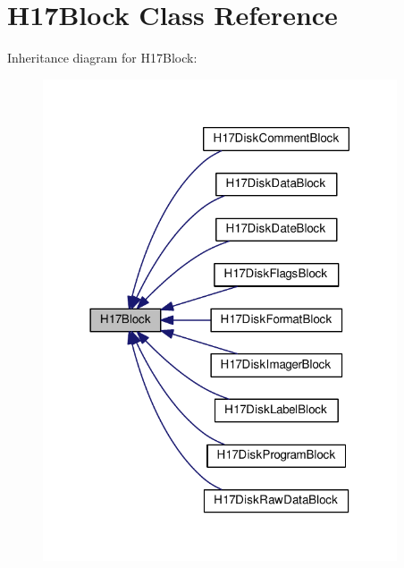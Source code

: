 \hypertarget{classH17Block}{}\section{H17\+Block Class Reference}
\label{classH17Block}


Inheritance diagram for H17\+Block\+:\nopagebreak
\begin{figure}[H]
\begin{center}
\leavevmode
\includegraphics[width=297pt]{classH17Block__inherit__graph}
\end{center}
\end{figure}
